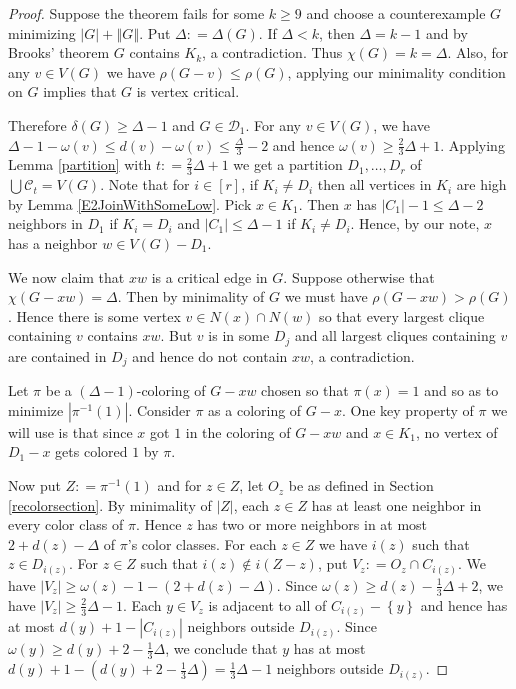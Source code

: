 \documentclass[12pt]{article}
\theoremstyle{plain}
\theoremstyle{definition}
\theoremstyle{remark}
\newcommand{\fancy}[1]{\mathcal{#1}}
\newcommand{\CC}{\fancy{C}}
\newcommand{\D}{\fancy{D}}
\newcommand{\set}[1]{\left\{ #1 \right\}}
\newcommand{\card}[1]{\left|#1\right|}
\newcommand{\size}[1]{\left\Vert#1\right\Vert}
\newcommand{\irange}[1]{\left[#1\right]}
\newcommand{\parens}[1]{\left( #1 \right)}
\newcommand{\DefinedAs}{\mathrel{\mathop:}=}
\def\D{\fancy{D}}
\begin{document}
\begin{proof}
Suppose the theorem fails for some $k \geq 9$ and choose a counterexample
$G$ minimizing $\card{G} + \size{G}$. Put $\Delta \DefinedAs \Delta(G)$.  If
$\Delta < k$, then $\Delta = k-1$ and by Brooks' theorem $G$ contains $K_k$, a
contradiction. Thus $\chi(G) = k = \Delta$.  Also, for any $v
\in V(G)$ we have $\rho(G-v) \leq \rho(G)$, applying our minimality condition on $G$ implies that $G$ is
vertex critical.

Therefore $\delta(G) \geq \Delta - 1$ and $G \in
\D_1$.  For any $v \in V(G)$, we have $\Delta - 1 - \omega(v) \leq d(v) -
\omega(v) \leq \frac{\Delta}{3} - 2$ and hence $\omega(v) \geq \frac23\Delta +
1$. Applying Lemma \ref{partition} with $t \DefinedAs \frac23\Delta + 1$ we
get a partition $D_1, \ldots, D_r$ of $\bigcup \CC_t = V(G)$.  Note that for $i
\in \irange{r}$, if $K_i \neq D_i$ then all vertices in $K_i$ are high by Lemma
\ref{E2JoinWithSomeLow}.  Pick $x \in K_1$.  Then $x$ has $\card{C_1} - 1 \leq
\Delta - 2$ neighbors in $D_1$ if $K_i = D_i$ and $\card{C_1} \leq \Delta - 1$
if $K_i \neq D_i$.  Hence, by our note, $x$ has a neighbor $w \in V(G) - D_1$.

We now claim that $xw$ is a critical edge in $G$.  Suppose otherwise that
$\chi(G - xw) = \Delta$.  Then by minimality of $G$ we must have $\rho(G-xw) >
\rho(G)$. Hence there is some vertex $v \in N(x) \cap N(w)$ so that every
largest clique containing $v$ contains $xw$.  But $v$ is in some $D_j$ and all largest cliques containing $v$ are contained in $D_j$ and hence do not contain $xw$, a contradiction.  

Let $\pi$ be a $(\Delta-1)$-coloring of $G - xw$ chosen so that $\pi(x) = 1$
and so as to minimize $\card{\pi^{-1}(1)}$. Consider $\pi$ as a coloring of
$G-x$. One key property of $\pi$ we will use is that since $x$ got $1$ in the
coloring of $G - xw$ and $x \in K_1$, no vertex of $D_1 - x$ gets colored $1$ by $\pi$.

Now put $Z \DefinedAs \pi^{-1}(1)$ and for $z \in Z$, let $O_z$ be as defined
in Section \ref{recolorsection}.  By minimality of $\card{Z}$, each $z \in Z$ has at least one neighbor in every color class of $\pi$.  
Hence $z$ has two or more neighbors in at most $2 + d(z) - \Delta$ of
$\pi$'s color classes. For each $z \in Z$ we have $i(z)$ such that $z \in D_{i(z)}$. For $z \in Z$ such that $i(z) \not \in i(Z - z)$, put $V_z \DefinedAs O_z \cap C_{i(z)}$.  We have $\card{V_z} \geq \omega(z) - 1 - \parens{2 + d(z) - \Delta}$.  Since $\omega(z) \geq d(z) - \frac13 \Delta + 2$, we have $\card{V_z} \geq \frac23 \Delta - 1$.   Each $y \in V_z$ is adjacent to all of $C_{i(z)} - \set{y}$ and hence has at most $d(y) + 1 - \card{C_{i(z)}}$ neighbors outside $D_{i(z)}$.  Since $\omega(y) \geq d(y) +
2 - \frac13 \Delta$, we conclude that $y$ has at most $d(y) + 1
- (d(y) + 2 - \frac13 \Delta) = \frac13 \Delta - 1$ neighbors outside $D_{i(z)}$.


\end{proof}
\end{document}
